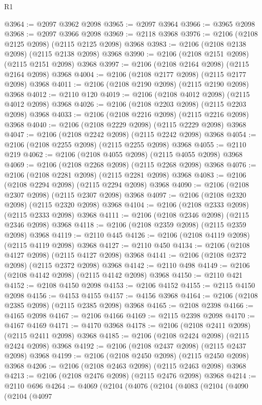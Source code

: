 \begin{lexlean}{R1}
\begin{coremodule}
@3964 := @2097 @3962 @2098
@3965 := @2097 @3964
@3966 := @3965 @2098
@3968 := @2097 @3966 @2098
@3969 := @2118 @3968
@3976 := @2106 (@2108 @2125 @2098) (@2115 @2125 @2098) @3968
@3983 := @2106 (@2108 @2138 @2098) (@2115 @2138 @2098) @3968
@3990 := @2106 (@2108 @2151 @2098) (@2115 @2151 @2098) @3968
@3997 := @2106 (@2108 @2164 @2098) (@2115 @2164 @2098) @3968
@4004 := @2106 (@2108 @2177 @2098) (@2115 @2177 @2098) @3968
@4011 := @2106 (@2108 @2190 @2098) (@2115 @2190 @2098) @3968
@4012 := @2110 @120
@4019 := @2106 (@2108 @4012 @2098) (@2115 @4012 @2098) @3968
@4026 := @2106 (@2108 @2203 @2098) (@2115 @2203 @2098) @3968
@4033 := @2106 (@2108 @2216 @2098) (@2115 @2216 @2098) @3968
@4040 := @2106 (@2108 @2229 @2098) (@2115 @2229 @2098) @3968
@4047 := @2106 (@2108 @2242 @2098) (@2115 @2242 @2098) @3968
@4054 := @2106 (@2108 @2255 @2098) (@2115 @2255 @2098) @3968
@4055 := @2110 @219
@4062 := @2106 (@2108 @4055 @2098) (@2115 @4055 @2098) @3968
@4069 := @2106 (@2108 @2268 @2098) (@2115 @2268 @2098) @3968
@4076 := @2106 (@2108 @2281 @2098) (@2115 @2281 @2098) @3968
@4083 := @2106 (@2108 @2294 @2098) (@2115 @2294 @2098) @3968
@4090 := @2106 (@2108 @2307 @2098) (@2115 @2307 @2098) @3968
@4097 := @2106 (@2108 @2320 @2098) (@2115 @2320 @2098) @3968
@4104 := @2106 (@2108 @2333 @2098) (@2115 @2333 @2098) @3968
@4111 := @2106 (@2108 @2346 @2098) (@2115 @2346 @2098) @3968
@4118 := @2106 (@2108 @2359 @2098) (@2115 @2359 @2098) @3968
@4119 := @2110 @445
@4126 := @2106 (@2108 @4119 @2098) (@2115 @4119 @2098) @3968
@4127 := @2110 @450
@4134 := @2106 (@2108 @4127 @2098) (@2115 @4127 @2098) @3968
@4141 := @2106 (@2108 @2372 @2098) (@2115 @2372 @2098) @3968
@4142 := @2110 @498
@4149 := @2106 (@2108 @4142 @2098) (@2115 @4142 @2098) @3968
@4150 := @2110 @421
@4152 := @2108 @4150 @2098
@4153 := @2106 @4152
@4155 := @2115 @4150 @2098
@4156 := @4153 @4155
@4157 := @4156 @3968
@4164 := @2106 (@2108 @2385 @2098) (@2115 @2385 @2098) @3968
@4165 := @2108 @2398
@4166 := @4165 @2098
@4167 := @2106 @4166
@4169 := @2115 @2398 @2098
@4170 := @4167 @4169
@4171 := @4170 @3968
@4178 := @2106 (@2108 @2411 @2098) (@2115 @2411 @2098) @3968
@4185 := @2106 (@2108 @2424 @2098) (@2115 @2424 @2098) @3968
@4192 := @2106 (@2108 @2437 @2098) (@2115 @2437 @2098) @3968
@4199 := @2106 (@2108 @2450 @2098) (@2115 @2450 @2098) @3968
@4206 := @2106 (@2108 @2463 @2098) (@2115 @2463 @2098) @3968
@4213 := @2106 (@2108 @2476 @2098) (@2115 @2476 @2098) @3968
@4214 := @2110 @696
@4264 := @4069
    (@2104
      (@4076
        (@2104
          (@4083
            (@2104
              (@4090
                (@2104
                  (@4097

\end{coremodule}
\end{lexlean}

